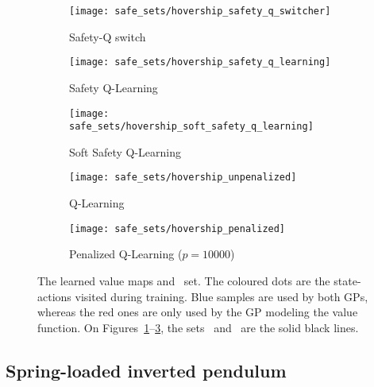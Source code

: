 \begin{figure}[t]
	\centering
	\begin{subfigure}{0.31\textwidth}
		\centering
		\texttt{[image: safe\_sets/hovership\_safety\_q\_switcher]}
		\caption{Safety-Q switch}
		\label{fig:learned sets:hovership:switch}
	\end{subfigure}	
	\begin{subfigure}{0.31\textwidth}
		\centering
		\texttt{[image: safe\_sets/hovership\_safety\_q\_learning]}
		\caption{Safety Q-Learning}
		\label{fig:learned sets:hovership:safety q learning}
	\end{subfigure}	
	\begin{subfigure}{0.31\textwidth}
		\centering
		\texttt{[image: safe\_sets/hovership\_soft\_safety\_q\_learning]}
		\caption{Soft Safety Q-Learning}
		\label{fig:learned sets:hovership:soft safety q learning}
	\end{subfigure}\newline
	\begin{subfigure}{0.39\textwidth}
		\texttt{[image: safe\_sets/hovership\_unpenalized]}
		\caption{Q-Learning}
		\label{fig:learned sets:hovership:q learning}
	\end{subfigure}
	\begin{subfigure}{0.39\textwidth}
		\captionsetup{width=1.1\textwidth}
		\texttt{[image: safe\_sets/hovership\_penalized]}
		\caption{Penalized Q-Learning ($p=10000$)}
		\label{fig:learned sets:hovership:penalized}
	\end{subfigure}
	\caption{The learned value maps and \Qcaut~set. The coloured dots are the state-actions visited during training. Blue samples are used by both GPs, whereas the red ones are only used by the GP modeling the value function. On Figures~\ref{fig:learned sets:hovership:switch}--\ref{fig:learned sets:hovership:soft safety q learning}, the sets \QV~and \Qcaut~are the solid black lines.}
	\label{fig:learned sets:hovership}
\end{figure}
\subsection{Spring-loaded inverted pendulum}

